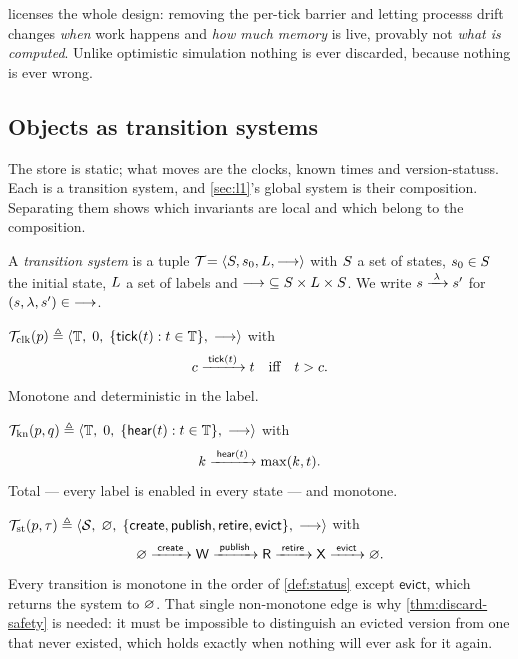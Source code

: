  licenses the whole design: removing the per-tick \gls{barrier}
and letting \glspl{process} drift changes \emph{when} work happens and
\emph{how much memory} is live, provably not \emph{what is computed}. Unlike
optimistic simulation nothing is ever discarded, because nothing is ever
wrong.

\subsection{Objects as transition systems}
\label{sec:l0-ts}

The \gls{store} is static; what moves are the clocks, known times and
\glspl{version-status}. Each is a transition system, and \cref{sec:l1}'s
global system is their composition. Separating them shows which invariants are
local and which belong to the composition.

\begin{definition}\label{def:ts}
A \emph{transition system} is a tuple
$\mathcal{T}_{} = \langle S, s_0, L, \longrightarrow \rangle$ with $S$ a set
of states, $s_0 \in S$ the initial state, $L$ a set of labels
and ${\longrightarrow} \subseteq S \times L \times S$. We write
$s \xrightarrow{\;\lambda\;} s'$ for $(s,\lambda,s') \in {\longrightarrow}$.
\end{definition}

\begin{definition}[Clock]\label{ts:clock}
$\mathcal{T}_{\mathrm{clk}}(p) \triangleq \langle \mathbb{T},\; 0,\;
 \{\mathsf{tick}(t) : t \in \mathbb{T}\},\; \longrightarrow \rangle$ with
\[
  c \xrightarrow{\;\mathsf{tick}(t)\;} t \quad\text{iff}\quad t > c .
\]
Monotone and deterministic in the label.
\end{definition}

\begin{definition}\label{ts:known}
$\mathcal{T}_{\mathrm{kn}}(p,q) \triangleq \langle \mathbb{T},\; 0,\;
 \{\mathsf{hear}(t) : t \in \mathbb{T}\},\; \longrightarrow \rangle$ with
\[
  k \xrightarrow{\;\mathsf{hear}(t)\;} \max(k, t).
\]
Total --- every label is enabled in every state --- and monotone.
\end{definition}

\begin{definition}\label{ts:version}
$\mathcal{T}_{\mathrm{st}}(p,\tau) \triangleq \langle \mathcal{S},\; \varnothing,\;
 \{\mathsf{create}, \mathsf{publish}, \mathsf{retire}, \mathsf{evict}\},\;
 \longrightarrow \rangle$ with
\[
  \varnothing \xrightarrow{\;\mathsf{create}\;} \mathsf{W}
  \xrightarrow{\;\mathsf{publish}\;} \mathsf{R}
  \xrightarrow{\;\mathsf{retire}\;} \mathsf{X}
  \xrightarrow{\;\mathsf{evict}\;} \varnothing .
\]
Every transition is monotone in the order of \cref{def:status} except
$\mathsf{evict}$, which returns the system to $\varnothing$. That single
non-monotone edge is why \cref{thm:discard-safety} is needed: it must be
impossible to distinguish an evicted version from one that never existed,
which holds exactly when nothing will ever ask for it again.
\end{definition}

